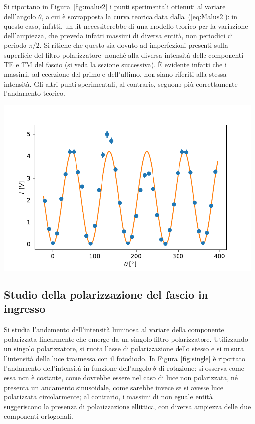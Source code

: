 \documentclass[10pt,oneside,a4paper]{article}
\newenvironment{Figure}
  {\par\medskip\noindent\minipage{\linewidth}}
  {\endminipage\par\medskip}
\begin{document}
\begin{multicols}{2}
Si riportano in Figura~\ref{fig:malus2} i punti sperimentali ottenuti al variare dell'angolo $\theta$, a cui è sovrapposta la curva teorica data dalla~(\ref{eq:Malus2}): in questo caso, infatti, un fit necessiterebbe di una modello teorico per la variazione dell'ampiezza, che preveda infatti massimi di diversa entità, non periodici di periodo $\pi / 2$. Si ritiene che questo sia dovuto ad imperfezioni presenti sulla superficie del filtro polarizzatore, nonché alla diversa intensità delle componenti TE e TM del fascio (si veda la sezione successiva). È evidente infatti che i massimi, ad eccezione del primo e dell'ultimo, non siano riferiti alla stessa intensità. Gli altri punti sperimentali, al contrario, seguono più correttamente l'andamento teorico.

\begin{Figure}
	\begin{center}
	\includegraphics[width=\linewidth]{malus2.pdf}
	\label{fig:malus2}
	\end{center}
\end{Figure}

\subsection{Studio della polarizzazione del fascio in ingresso}\label{sec:polarizzazione}
Si studia l'andamento dell'intensità luminosa al variare della componente polarizzata linearmente che emerge da un singolo filtro polarizzatore. Utilizzando un singolo polarizzatore, si ruota l'asse di polarizzazione dello stesso e si misura l'intensità della luce trasmessa con il fotodiodo. In Figura~\ref{fig:single} è riportato l'andamento dell'intensità in funzione dell'angolo $\theta$ di rotazione: si osserva come essa non è costante, come dovrebbe essere nel caso di luce non polarizzata, né presenta un andamento sinusoidale, come sarebbe invece se si avesse luce polarizzata circolarmente; al contrario, i massimi di non eguale entità suggeriscono la presenza di polarizzazione ellittica, con diversa ampiezza delle due componenti ortogonali.


\end{multicols}
\end{document}
